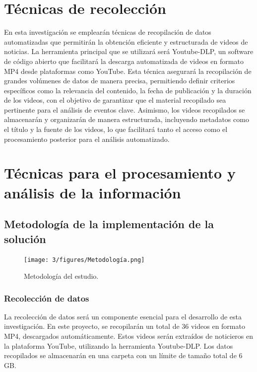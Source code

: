 \section{Técnicas de recolección}

En esta investigación se emplearán técnicas de recopilación de datos automatizadas que permitirán la obtención eficiente y estructurada de videos de noticias. La herramienta principal que se utilizará será Youtube-DLP, un software de código abierto que facilitará la descarga automatizada de videos en formato MP4 desde plataformas como YouTube. Esta técnica asegurará la recopilación de grandes volúmenes de datos de manera precisa, permitiendo definir criterios específicos como la relevancia del contenido, la fecha de publicación y la duración de los videos, con el objetivo de garantizar que el material recopilado sea pertinente para el análisis de eventos clave. Asimismo, los videos recopilados se almacenarán y organizarán de manera estructurada, incluyendo metadatos como el título y la fuente de los videos, lo que facilitará tanto el acceso como el procesamiento posterior para el análisis automatizado.

\section{Técnicas para el procesamiento y análisis de la información}

\subsection{Metodología de la implementación de la solución}

\begin{figure}[H]
	\centering
	\texttt{[image: 3/figures/Metodología.png]}
	\caption{Metodología del estudio.}
\end{figure}

\subsubsection{Recolección de datos}
La recolección de datos será un componente esencial para el desarrollo de esta investigación. En este proyecto, se recopilarán un total de 36 videos en formato MP4, descargados automáticamente. Estos videos serán extraídos de noticieros en la plataforma YouTube, utilizando la herramienta Youtube-DLP. Los datos recopilados se almacenarán en una carpeta con un límite de tamaño total de 6 GB.


